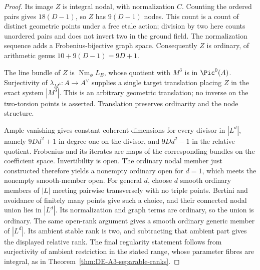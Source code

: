 \begin{proof}
Its image $Z$ is integral nodal, with normalization $C$.  Counting
the ordered pairs gives $18(D-1)$, so $Z$ has $9(D-1)$ nodes.
This count is a count of distinct geometric points under a free
etale action; division by two here counts unordered pairs and does
not invert two in the ground field.  The normalization sequence
adds a Frobenius-bijective graph space.  Consequently $Z$ is
ordinary, of arithmetic genus $10+9(D-1)=9D+1$.

The line bundle of $Z$ is $\operatorname{Nm}_\phi L_B$, whose
quotient with $M^3$ is in $\Pic^0(A)$.  Surjectivity of
$\lambda_{M^3}:A\to A^\vee$ supplies a single target translation
placing $Z$ in the exact system $|M^3|$.  This is an arbitrary
geometric translation; no inverse on the two-torsion points is
asserted.  Translation preserves ordinarity and the node structure.

Ample vanishing gives constant coherent dimensions for every divisor
in $|L^d|$, namely $9Dd^2+1$ in degree one on the divisor, and
$9Dd^2-1$ in the relative quotient.  Frobenius and its iterates
are maps of the corresponding bundles on the coefficient space.
Invertibility is open.  The ordinary nodal member just constructed
therefore yields a nonempty ordinary open for $d=1$, which meets
the nonempty smooth-member open.
For general $d$, choose $d$ smooth ordinary members of $|L|$
meeting pairwise transversely with no triple points.  Bertini and
avoidance of finitely many points give such a choice, and their
connected nodal union lies in $|L^d|$.  Its normalization and graph
terms are ordinary, so the union is ordinary.  The same open-rank
argument gives a smooth ordinary generic member of $|L^d|$.
Its ambient stable rank is two, and subtracting that ambient part
gives the displayed relative rank.  The final regularity statement
follows from surjectivity of ambient restriction in the stated range,
whose parameter fibres are integral, as in
Theorem~\ref{thm:DE-A3-separable-ranks}.
\end{proof}

